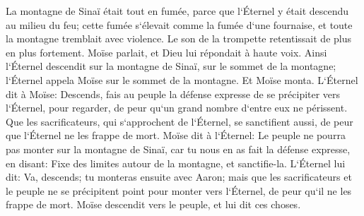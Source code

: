 \verse La montagne de Sinaï était tout en fumée, parce que l`Éternel y était descendu au milieu du feu; cette fumée s`élevait comme la fumée d`une fournaise, et toute la montagne tremblait avec violence. 
\verse Le son de la trompette retentissait de plus en plus fortement. Moïse parlait, et Dieu lui répondait à haute voix. 
\verse Ainsi l`Éternel descendit sur la montagne de Sinaï, sur le sommet de la montagne; l`Éternel appela Moïse sur le sommet de la montagne. Et Moïse monta. 
\verse L`Éternel dit à Moïse: Descends, fais au peuple la défense expresse de se précipiter vers l`Éternel, pour regarder, de peur qu`un grand nombre d`entre eux ne périssent. 
\verse Que les sacrificateurs, qui s`approchent de l`Éternel, se sanctifient aussi, de peur que l`Éternel ne les frappe de mort. 
\verse Moïse dit à l`Éternel: Le peuple ne pourra pas monter sur la montagne de Sinaï, car tu nous en as fait la défense expresse, en disant: Fixe des limites autour de la montagne, et sanctifie-la. 
\verse L`Éternel lui dit: Va, descends; tu monteras ensuite avec Aaron; mais que les sacrificateurs et le peuple ne se précipitent point pour monter vers l`Éternel, de peur qu`il ne les frappe de mort. 
\verse Moïse descendit vers le peuple, et lui dit ces choses. 

